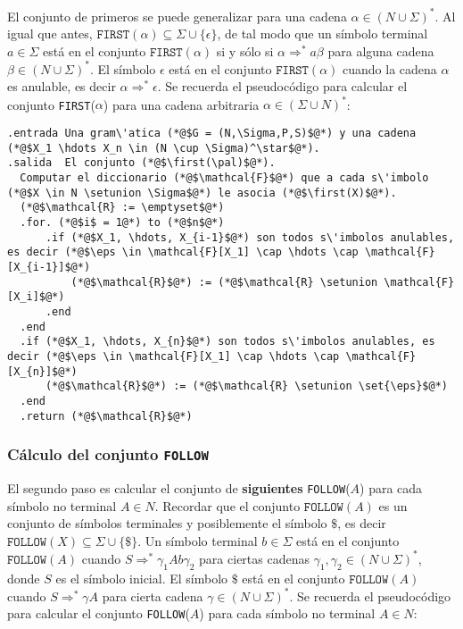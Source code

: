 \documentclass{article}
\newcommand{\first}{\texttt{FIRST}\xspace}
\newcommand{\follow}{\texttt{FOLLOW}\xspace}
\newcommand{\setunion}{\cup}
\newcommand{\set}[1]{\{#1\}}
\newcommand{\eps}{\epsilon}
\newcommand{\pal}{\alpha}
\renewcommand{\emptyset}{\varnothing}
\begin{document}
El conjunto de primeros se puede generalizar para una cadena $\alpha \in (N \cup \Sigma)^*$.
Al igual que antes, $\first(\alpha) \subseteq \Sigma \cup \set{\eps}$,
de tal modo que un s\'imbolo terminal $a \in \Sigma$ est\'a en el conjunto $\texttt{FIRST}(\alpha)$
si y s\'olo si $\alpha \Rightarrow^* a\beta$ para alguna cadena $\beta \in (N \cup \Sigma)^*$.
El s\'imbolo $\eps$ est\'a en el conjunto $\texttt{FIRST}(\alpha)$
cuando la cadena $\alpha$ es anulable, es decir $\alpha \Rightarrow^* \eps$.
Se recuerda el pseudoc\'odigo para calcular el conjunto \texttt{FIRST}($\alpha$) para
una cadena arbitraria $\alpha \in (\Sigma \cup N)^*$:
\begin{lstlisting}
.entrada Una gram\'atica (*@$G = (N,\Sigma,P,S)$@*) y una cadena (*@$X_1 \hdots X_n \in (N \cup \Sigma)^\star$@*).
.salida  El conjunto (*@$\first(\pal)$@*).
  Computar el diccionario (*@$\mathcal{F}$@*) que a cada s\'imbolo (*@$X \in N \setunion \Sigma$@*) le asocia (*@$\first(X)$@*).
  (*@$\mathcal{R} := \emptyset$@*)
  .for. (*@$i$ = 1@*) to (*@$n$@*)
      .if (*@$X_1, \hdots, X_{i-1}$@*) son todos s\'imbolos anulables, es decir (*@$\eps \in \mathcal{F}[X_1] \cap \hdots \cap \mathcal{F}[X_{i-1}]$@*)
          (*@$\mathcal{R}$@*) := (*@$\mathcal{R} \setunion \mathcal{F}[X_i]$@*)
      .end
  .end
  .if (*@$X_1, \hdots, X_{n}$@*) son todos s\'imbolos anulables, es decir (*@$\eps \in \mathcal{F}[X_1] \cap \hdots \cap \mathcal{F}[X_{n}]$@*)
      (*@$\mathcal{R}$@*) := (*@$\mathcal{R} \setunion \set{\eps}$@*)
  .end
  .return (*@$\mathcal{R}$@*)
\end{lstlisting}


\subsubsection{C\'alculo del conjunto \texttt{FOLLOW}}

El segundo paso es calcular el conjunto de {\bf siguientes} \texttt{FOLLOW}($A$) para cada s\'imbolo no terminal $A \in N$.
Recordar que el conjunto $\follow(A)$ es un conjunto de s\'imbolos terminales y posiblemente el s\'imbolo $\$$,
es decir $\follow(X) \subseteq \Sigma \cup \set{\$}$.
Un s\'imbolo terminal $b \in \Sigma$ est\'a en el conjunto $\texttt{FOLLOW}(A)$
cuando $S \Rightarrow^* \gamma_1 A b \gamma_2$ para ciertas cadenas $\gamma_1, \gamma_2 \in (N \cup \Sigma)^*$,
donde $S$ es el s\'imbolo inicial.
El s\'imbolo $\$$ est\'a en el conjunto $\texttt{FOLLOW}(A)$
cuando $S \Rightarrow^* \gamma A$ para cierta cadena $\gamma \in (N \cup \Sigma)^*$.
Se recuerda el pseudoc\'odigo para calcular el conjunto \texttt{FOLLOW}($A$) para
cada s\'imbolo no terminal $A \in N$:
\end{document}
